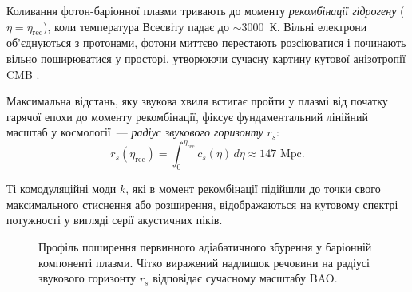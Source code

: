 \documentclass[12pt, a4paper]{article}
\begin{document}
Коливання фотон-баріонної плазми тривають до моменту \emph{рекомбінації гідрогену} ($\eta = \eta_{\mathrm{rec}}$), коли температура Всесвіту падає до $\sim 3000$~К. Вільні електрони об'єднуються з протонами, фотони миттєво перестають розсіюватися і починають вільно поширюватися у просторі, утворюючи сучасну картину кутової анізотропії CMB \cite{peebles_yu_1970}.

Максимальна відстань, яку звукова хвиля встигає пройти у плазмі від початку гарячої епохи до моменту рекомбінації, фіксує фундаментальний лінійний масштаб у космології~--- \emph{радіус звукового горизонту} $r_s$:
\begin{equation}\label{eq:sound_horizon}
  r_s(\eta_{\mathrm{rec}}) = \int_0^{\eta_{\mathrm{rec}}} c_s(\eta)\,d\eta \approx 147 \text{ Mpc}.
\end{equation}

Ті комодуляційні моди $k$, які в момент рекомбінації підійшли до точки свого максимального стиснення або розширення, відображаються на кутовому спектрі потужності у вигляді серії акустичних піків.

\begin{figure}[htbp]
\centering
{}
\caption{Профіль поширення первинного адіабатичного збурення у баріонній компоненті плазми. Чітко виражений надлишок речовини на радіусі звукового горизонту $r_s$ відповідає сучасному масштабу BAO.}
\label{fig:bao_profile}
\end{figure}
\end{document}
